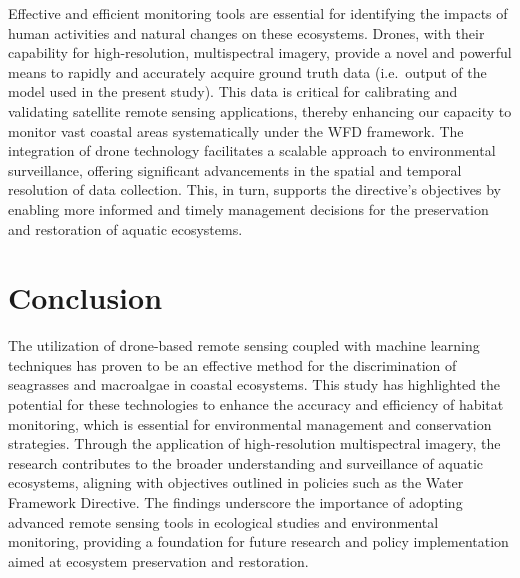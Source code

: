 \documentclass[
  number]{elsarticle}
\begin{document}
Effective and efficient monitoring tools are essential for identifying
the impacts of human activities and natural changes on these ecosystems.
Drones, with their capability for high-resolution, multispectral
imagery, provide a novel and powerful means to rapidly and accurately
acquire ground truth data (i.e.~output of the model used in the present
study). This data is critical for calibrating and validating satellite
remote sensing applications, thereby enhancing our capacity to monitor
vast coastal areas systematically under the WFD framework. The
integration of drone technology facilitates a scalable approach to
environmental surveillance, offering significant advancements in the
spatial and temporal resolution of data collection. This, in turn,
supports the directive's objectives by enabling more informed and timely
management decisions for the preservation and restoration of aquatic
ecosystems.

\section{Conclusion}\label{conclusion}

The utilization of drone-based remote sensing coupled with machine
learning techniques has proven to be an effective method for the
discrimination of seagrasses and macroalgae in coastal ecosystems. This
study has highlighted the potential for these technologies to enhance
the accuracy and efficiency of habitat monitoring, which is essential
for environmental management and conservation strategies. Through the
application of high-resolution multispectral imagery, the research
contributes to the broader understanding and surveillance of aquatic
ecosystems, aligning with objectives outlined in policies such as the
Water Framework Directive. The findings underscore the importance of
adopting advanced remote sensing tools in ecological studies and
environmental monitoring, providing a foundation for future research and
policy implementation aimed at ecosystem preservation and restoration.


  
\end{document}
